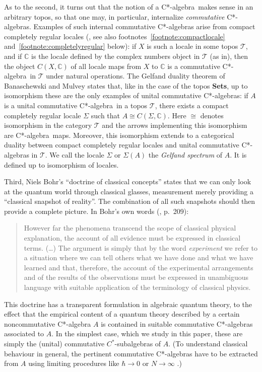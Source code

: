 \documentclass[12pt]{article}
\newcommand{\Sets}{\mbox{\textbf{Sets}}}
\newcommand{\ca}{C*-algebra} \newcommand{\jba}{JB-algebra}
\newcommand{\raw}{\rightarrow} \newcommand{\rat}{\mapsto}
\newcommand{\Sg}{\Sigma} \newcommand{\ta}{\tau} \newcommand{\ph}{\phi}
\newcommand{\CT}{{\mathcal T}} \newcommand{\CV}{{\mathcal V}}
\newcommand{\C}{{\mathbb C}} \newcommand{\D}{{\mathbb D}}
\begin{document}
As to the second, it turns out that the
notion of a \ca\ makes sense in an arbitrary topos,
so that one may, in particular, internalize
{\it commutative}  \ca s. Examples of such internal commutative \ca s
arise from compact completely regular locales
(\cite{banaschewskimulvey06, johnstone82}, see also
footnotes~\ref{footnote:compactlocale} and~\ref{footnote:completelyregular}
below):
 if $X$ is such a locale in some topos $\CT$, and if
$\C$ is the locale defined by the complex numbers object in $\CT$ (as
in\cite{banaschewskimulvey06}), then the
object $C(X,\C)$ of all locale maps from
$X$ to $\C$ is a commutative \ca\ in $\CT$ under natural operations.
The Gelfand duality theorem of Banaschewski and Mulvey
\cite{banaschewskimulvey06} states that, like in the case of the topos \Sets, up
to isomorphism these are the only examples of unital
 commutative \ca s:
 if $A$ is a unital commutative \ca\ in a topos $\CT$,
 there exists a  compact completely  regular
 locale $\Sg$ such that
$A\cong C(\Sg,\C)$. Here $\cong$ denotes isomorphism in the category $\CT$ and
the arrows implementing this isomorphism are \ca\ maps.
 Moreover,  this isomorphism extends to a categorical duality
 between  compact completely  regular locales and unital
 commutative \ca s in $\CT$.  We call the locale $\Sg$ or $\Sg(A)$
the {\it Gelfand spectrum} of $A$. It is defined up to isomorphism of locales.

Third, Niels Bohr's ``doctrine of classical concepts''  states that we can only
look at the quantum world through classical glasses, measurement merely
providing a
``classical snapshot of reality''.  The combination of all such
snapshots should then provide a complete picture. In Bohr's own words
(\cite{bohr49}, p.\ 209):
\begin{quote}
However far the phenomena transcend the scope of classical physical
explanation, the account of all evidence must be expressed in
classical terms. (\ldots) The argument is simply that by the word {\it
experiment} we refer to a situation where we can tell others what we
have done and what we have learned and that, therefore, the account of
the experimental arrangements and of the results of the observations
must be expressed in unambiguous language with suitable application of
the terminology of classical physics.
\end{quote}
This doctrine  has a transparent formulation in algebraic quantum
theory, to the effect that the empirical content of a quantum theory
described by a certain noncommutative C*-algebra $A$ is contained in
suitable commutative C*-algebras associated to $A$. In the simplest
case, which we study in this paper, these are simply the (unital)
commutative $C^*$-subalgebras of $A$. (To understand classical
behaviour in general, the  pertinent commutative C*-algebras have to
be extracted from $A$ using  limiting procedures like $\hbar\raw 0$ or
$N\raw\infty$ \cite{landsman07}.)
\end{document}
